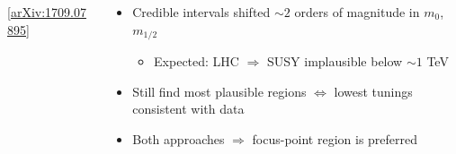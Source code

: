 \documentclass[10pt,aspectratio=169]{beamer}
\newcommand{\mzero}{\ensuremath{m_0}\xspace}
\newcommand{\mhalf}{\ensuremath{m_{1/2}}\xspace}
\begin{document}
\begin{frame}
\begin{columns}[t]
\begin{column}{0.7\textwidth}
      \vspace{-12pt}
      \begin{center}
        \tiny [\href{http://arxiv.org/abs/1709.07895}{arXiv:1709.07895}]
      \end{center}
    \end{column}
    \begin{column}{0.3\textwidth}
      \begin{itemize} \itemsep1em
      \item \alert{Credible intervals shifted $\sim 2$ orders of magnitude in
        \mzero, \mhalf}
        \begin{itemize} \itemsep0.8em
        \item Expected: LHC  $\Rightarrow$ SUSY implausible below $\sim 1$ TeV
        \end{itemize}
      \item Still find most plausible regions $\Leftrightarrow$ lowest
        tunings {\color{blue} consistent with data}
      \item Both approaches $\Rightarrow$ focus-point region is preferred
      \end{itemize}
    \end{column}
  \end{columns}
\end{frame}
\end{document}
